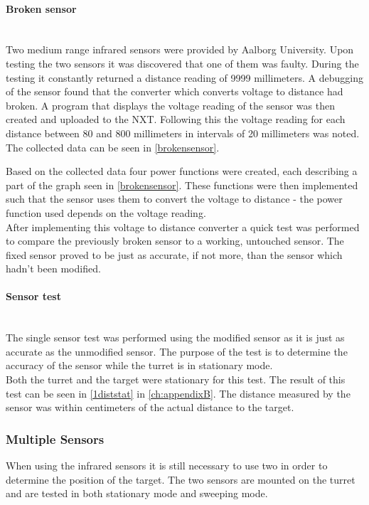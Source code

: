 \paragraph{Broken sensor} ~\\
Two medium range infrared sensors were provided by Aalborg University. Upon testing the two sensors it was discovered that one of them was faulty. During the testing it constantly returned a distance reading of 9999 millimeters. A debugging of the sensor found that the converter which converts voltage to distance had broken. A program that displays the voltage reading of the sensor was then created and uploaded to the NXT. Following this the voltage reading for each distance between 80 and 800 millimeters in intervals of 20 millimeters was noted. The collected data can be seen in \cref{brokensensor}. 



Based on the collected data four power functions were created, each describing a part of the graph seen in \cref{brokensensor}. These functions were then implemented such that the sensor uses them to convert the voltage to distance - the power function used depends on the voltage reading. \\

After implementing this voltage to distance converter a quick test was performed to compare the previously broken sensor to a working, untouched sensor. The fixed sensor proved to be just as accurate, if not more, than the sensor which hadn't been modified.

\paragraph{Sensor test} ~\\
The single sensor test was performed using the modified sensor as it is just as accurate as the unmodified sensor. The purpose of the test is to determine the accuracy of the sensor while the turret is in stationary mode. \\

Both the turret and the target were stationary for this test. The result of this test can be seen in \cref{1diststat} in \cref{ch:appendixB}. The distance measured by the sensor was within  centimeters of the actual distance to the target.

\subsubsection{Multiple Sensors}
When using the infrared sensors it is still necessary to use two in order to determine the position of the target. The two sensors are mounted on the turret and are tested in both stationary mode and sweeping mode.

